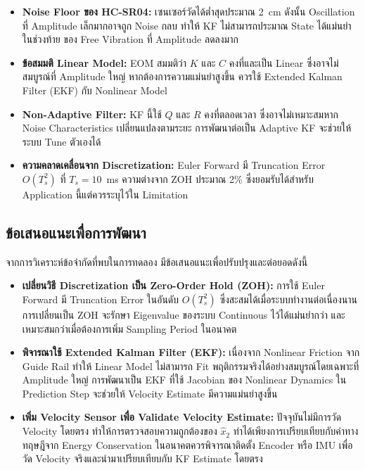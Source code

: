 \begin{itemize}
    \item \textbf{Noise Floor ของ HC-SR04:} เซนเซอร์วัดได้ต่ำสุดประมาณ 2~cm
          ดังนั้น Oscillation ที่ Amplitude เล็กมากอาจถูก Noise กลบ
          ทำให้ KF ไม่สามารถประมาณ State ได้แม่นยำในช่วงท้าย
          ของ Free Vibration ที่ Amplitude ลดลงมาก

    \item \textbf{ข้อสมมติ Linear Model:} EOM สมมติว่า $K$ และ $C$
          คงที่และเป็น Linear ซึ่งอาจไม่สมบูรณ์ที่ Amplitude ใหญ่
          หากต้องการความแม่นยำสูงขึ้น ควรใช้ Extended Kalman Filter (EKF)
          กับ Nonlinear Model

    \item \textbf{Non-Adaptive Filter:} KF นี้ใช้ $Q$ และ $R$ คงที่ตลอดเวลา
          ซึ่งอาจไม่เหมาะสมหาก Noise Characteristics เปลี่ยนแปลงตามระยะ
          การพัฒนาต่อเป็น Adaptive KF จะช่วยให้ระบบ Tune ตัวเองได้

    \item \textbf{ความคลาดเคลื่อนจาก Discretization:}
          Euler Forward มี Truncation Error $O(T_s^2)$
          ที่ $T_s = 10$~ms ความต่างจาก ZOH ประมาณ 2\%
          ซึ่งยอมรับได้สำหรับ Application นี้แต่ควรระบุไว้ใน Limitation
\end{itemize}

\subsection{ข้อเสนอแนะเพื่อการพัฒนา}
 
จากการวิเคราะห์ข้อจำกัดที่พบในการทดลอง มีข้อเสนอแนะเพื่อปรับปรุงและต่อยอดดังนี้
 
\begin{itemize}
    \item \textbf{เปลี่ยนวิธี Discretization เป็น Zero-Order Hold (ZOH):} การใช้ Euler Forward มี Truncation Error ในอันดับ $O(T_s^2)$ ซึ่งสะสมได้เมื่อระบบทำงานต่อเนื่องนาน การเปลี่ยนเป็น ZOH จะรักษา Eigenvalue ของระบบ Continuous ไว้ได้แม่นยำกว่า และเหมาะสมกว่าเมื่อต้องการเพิ่ม Sampling Period ในอนาคต
    \item \textbf{พิจารณาใช้ Extended Kalman Filter (EKF):} เนื่องจาก Nonlinear Friction จาก Guide Rail ทำให้ Linear Model ไม่สามารถ Fit พฤติกรรมจริงได้อย่างสมบูรณ์โดยเฉพาะที่ Amplitude ใหญ่ การพัฒนาเป็น EKF ที่ใช้ Jacobian ของ Nonlinear Dynamics ใน Prediction Step จะช่วยให้ Velocity Estimate มีความแม่นยำสูงขึ้น
    \item \textbf{เพิ่ม Velocity Sensor เพื่อ Validate Velocity Estimate:} ปัจจุบันไม่มีการวัด Velocity โดยตรง ทำให้การตรวจสอบความถูกต้องของ $\hat{x}_2$ ทำได้เพียงการเปรียบเทียบกับค่าทางทฤษฎีจาก Energy Conservation ในอนาคตควรพิจารณาติดตั้ง Encoder หรือ IMU เพื่อวัด Velocity จริงและนำมาเปรียบเทียบกับ KF Estimate โดยตรง
\end{itemize}